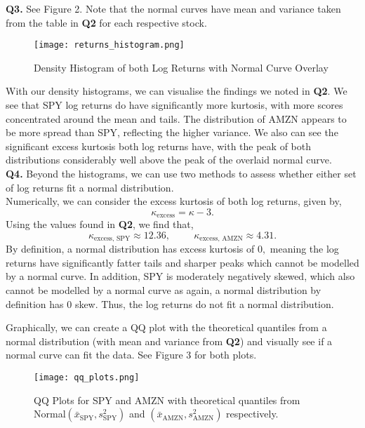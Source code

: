 \documentclass[twocolumn]{article}
\begin{document}
\newpage

\textbf{Q3.} See Figure 2. Note that the normal curves have mean and variance taken from the table in \textbf{Q2} for each respective stock. 
\begin{figure}[htp]
    \centering
    \texttt{[image: returns\_histogram.png]}
    \caption{Density Histogram of both Log Returns with Normal Curve Overlay}
    \label{fig:galaxy}
\end{figure}

With our density histograms, we can visualise the findings we noted in \textbf{Q2}. We see that SPY log returns do have significantly more kurtosis, with more scores concentrated around the mean and tails. The distribution of AMZN appears to be more spread than SPY, reflecting the higher variance. We also can see the significant excess kurtosis both log returns have, with the peak of both distributions considerably well above the peak of the overlaid normal curve. \\

\textbf{Q4.} Beyond the histograms, we can use two methods to assess whether either set of log returns fit a normal distribution. \\ 

Numerically, we can consider the excess kurtosis of both log returns, given by,
$$\kappa_{\text{excess}} = \kappa - 3.$$
Using the values found in \textbf{Q2}, we find that,
$$\kappa_{\text{excess, SPY}} \approx 12.36, \hspace{1cm} \kappa_{\text{excess, AMZN}} \approx 4.31.$$
By definition, a normal distribution has excess kurtosis of $0,$ meaning the log returns have significantly fatter tails and sharper peaks which cannot be modelled by a normal curve. In addition, SPY is moderately negatively skewed, which also cannot be modelled by a normal curve as again, a normal distribution by definition has $0$ skew. Thus, the log returns do not fit a normal distribution. \\

\newpage

Graphically, we can create a QQ plot with the theoretical quantiles from a normal distribution (with mean and variance from \textbf{Q2}) and visually see if a normal curve can fit the data. See Figure 3 for both plots.

\begin{figure}[htp]
    \centering
    \texttt{[image: qq\_plots.png]}
    \caption{QQ Plots for SPY and AMZN with theoretical quantiles from Normal$\left( \bar{x}_{\text{SPY}}, s_{\text{SPY}}^2\right)$ and $\left( \bar{x}_{\text{AMZN}}, s_{\text{AMZN}}^2\right)$ respectively.}
    \label{fig:galaxy}
\end{figure}
\end{document}
